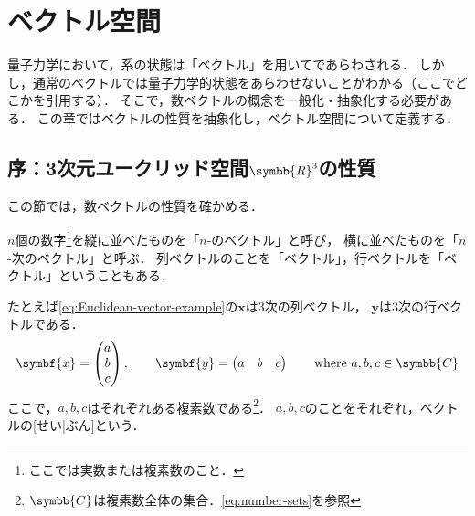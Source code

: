 \documentclass[../sotsu.tex]{subfiles}
\begin{document}
\section{ベクトル空間}

量子力学において，系の状態は「ベクトル」を用いてであらわされる．
しかし，通常のベクトルでは量子力学的状態をあらわせないことがわかる（ここでどこかを引用する）．
そこで，数ベクトルの概念を一般化・抽象化する必要がある．
この章ではベクトルの性質を抽象化し，ベクトル空間について定義する．

\subsection*{序：3次元ユークリッド空間$\symbb{R}^3$の性質}

この節では，数ベクトルの性質を確かめる．

$n$個の数字\footnote{ここでは実数または複素数のこと．}を縦に並べたものを「$n$-のベクトル」と呼び，
横に並べたものを「$n$-次のベクトル」と呼ぶ\cite{miyake-lin-2008}．
列ベクトルのことを「ベクトル」，行ベクトルを「ベクトル」ということもある．

たとえば\cref{eq:Euclidean-vector-example}の$\symbf{x}$は3次の列ベクトル，
$\symbf{y}$は3次の行ベクトルである．
\begin{align}
    \label{eq:complex-Euclidean-vector-example}
    \symbf{x} = 
    \begin{pmatrix}
        a  \\  b  \\  c
    \end{pmatrix}
    , \qquad
    \symbf{y} = 
    \begin{pmatrix}
        a  &  b  &  c
    \end{pmatrix}
    \qquad 
    \text{where $a, b, c \in \symbb{C}$}
\end{align}
ここで，$a, b, c$はそれぞれある複素数である\footnote{$\symbb{C}$は複素数全体の集合．\cref{eq:number-sets}を参照}．
$a, b, c$のことをそれぞれ，ベクトルの[せい|ぶん]という．
\end{document}
